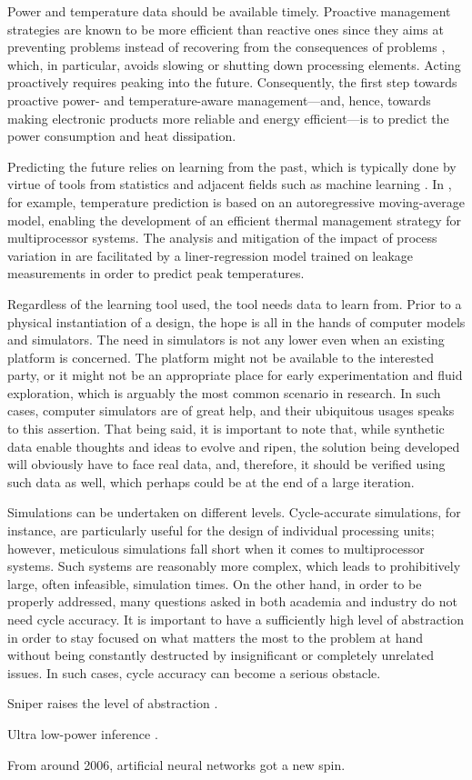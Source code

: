 Power and temperature data should be available timely. Proactive management
strategies are known to be more efficient than reactive ones since they aims at
preventing problems instead of recovering from the consequences of problems
\cite{coskun2008, chaudhry2015}, which, in particular, avoids slowing or
shutting down processing elements. Acting proactively requires peaking into the
future. Consequently, the first step towards proactive power- and
temperature-aware management---and, hence, towards making electronic products
more reliable and energy efficient---is to predict the power consumption and
heat dissipation.

Predicting the future relies on learning from the past, which is typically done
by virtue of tools from statistics and adjacent fields such as machine learning
\cite{bishop2006}. In \cite{coskun2008}, for example, temperature prediction is
based on an autoregressive moving-average model, enabling the development of an
efficient thermal management strategy for multiprocessor systems. The analysis
and mitigation of the impact of process variation in \cite{juan2014} are
facilitated by a liner-regression model trained on leakage measurements in order
to predict peak temperatures.

Regardless of the learning tool used, the tool needs data to learn from. Prior
to a physical instantiation of a design, the hope is all in the hands of
computer models and simulators. The need in simulators is not any lower even
when an existing platform is concerned. The platform might not be available to
the interested party, or it might not be an appropriate place for early
experimentation and fluid exploration, which is arguably the most common
scenario in research. In such cases, computer simulators are of great help, and
their ubiquitous usages speaks to this assertion. That being said, it is
important to note that, while synthetic data enable thoughts and ideas to evolve
and ripen, the solution being developed will obviously have to face real data,
and, therefore, it should be verified using such data as well, which perhaps
could be at the end of a large iteration.

Simulations can be undertaken on different levels. Cycle-accurate simulations,
for instance, are particularly useful for the design of individual processing
units; however, meticulous simulations fall short when it comes to
multiprocessor systems. Such systems are reasonably more complex, which leads to
prohibitively large, often infeasible, simulation times. On the other hand, in
order to be properly addressed, many questions asked in both academia and
industry do not need cycle accuracy. It is important to have a sufficiently high
level of abstraction in order to stay focused on what matters the most to the
problem at hand without being constantly destructed by insignificant or
completely unrelated issues. In such cases, cycle accuracy can become a serious
obstacle.

Sniper raises the level of abstraction \cite{carlson2011}.

Ultra low-power inference \cite{park2015}.

From around 2006, artificial neural networks got a new spin.
